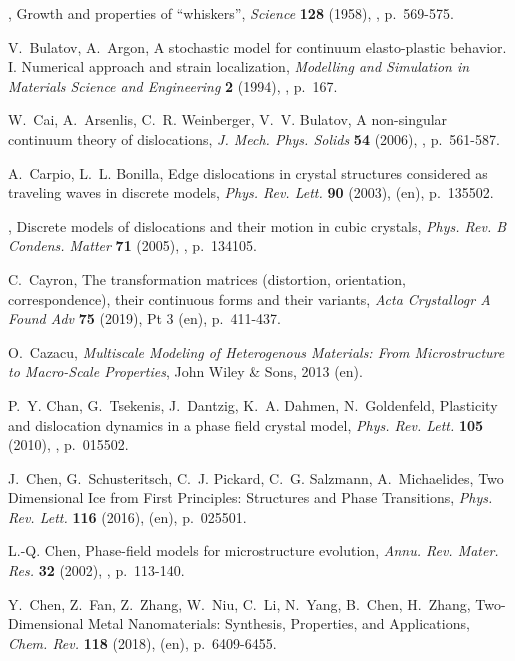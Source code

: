 \documentclass[CRPHYS,Unicode,manuscript]{cedram}
\begin{document}
\begin{thebibliography}{100}
\bysame , {\og Growth and properties of ``whiskers''\fg}, \emph{Science}
  \textbf{128} (1958), , p.~569-575.

V.~Bulatov, A.~Argon, {\og A stochastic model for continuum elasto-plastic
  behavior. I. Numerical approach and strain localization\fg}, \emph{Modelling
  and Simulation in Materials Science and Engineering} \textbf{2} (1994),
  , p.~167.

W.~Cai, A.~Arsenlis, C.~R. Weinberger, V.~V. Bulatov, {\og A non-singular
  continuum theory of dislocations\fg}, \emph{J. Mech. Phys. Solids}
  \textbf{54} (2006), , p.~561-587.

A.~Carpio, L.~L. Bonilla, {\og Edge dislocations in crystal structures
  considered as traveling waves in discrete models\fg}, \emph{Phys. Rev. Lett.}
  \textbf{90} (2003),  (en), p.~135502.

\bysame , {\og Discrete models of dislocations and their motion in cubic
  crystals\fg}, \emph{Phys. Rev. B Condens. Matter} \textbf{71} (2005),
  , p.~134105.

C.~Cayron, {\og The transformation matrices (distortion, orientation,
  correspondence), their continuous forms and their variants\fg}, \emph{Acta
  Crystallogr A Found Adv} \textbf{75} (2019), \cdrnumero Pt 3 (en),
  p.~411-437.

O.~Cazacu, \emph{Multiscale Modeling of Heterogenous Materials: From
  Microstructure to {Macro-Scale} Properties}, John Wiley \& Sons, 2013 (en).

P.~Y. Chan, G.~Tsekenis, J.~Dantzig, K.~A. Dahmen, N.~Goldenfeld, {\og
  Plasticity and dislocation dynamics in a phase field crystal model\fg},
  \emph{Phys. Rev. Lett.} \textbf{105} (2010), , p.~015502.

J.~Chen, G.~Schusteritsch, C.~J. Pickard, C.~G. Salzmann, A.~Michaelides, {\og
  Two Dimensional Ice from First Principles: Structures and Phase
  Transitions\fg}, \emph{Phys. Rev. Lett.} \textbf{116} (2016), 
  (en), p.~025501.

L.-Q. Chen, {\og Phase-field models for microstructure evolution\fg},
  \emph{Annu. Rev. Mater. Res.} \textbf{32} (2002), , p.~113-140.

Y.~Chen, Z.~Fan, Z.~Zhang, W.~Niu, C.~Li, N.~Yang, B.~Chen, H.~Zhang, {\og
  {Two-Dimensional} Metal Nanomaterials: Synthesis, Properties, and
  Applications\fg}, \emph{Chem. Rev.} \textbf{118} (2018),  (en),
  p.~6409-6455.


\end{thebibliography}
\end{document}
